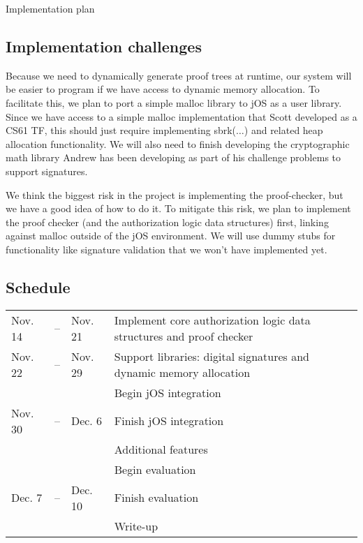 \documentclass[10pt]{article}
\begin{document}
\begin{section}{Implementation plan}
\subsection{Implementation challenges}

Because we need to dynamically generate proof trees at runtime, our system will be easier to program if we have access to dynamic memory allocation.
To facilitate this, we plan to port a simple malloc library to jOS as a user library. Since we have access to a simple malloc implementation that Scott developed as a CS61 TF, this should just require implementing \textsf{sbrk($\ldots$)} and related heap allocation functionality.
We will also need to finish developing the cryptographic math library Andrew has been developing as part of his challenge problems to support signatures.

We think the biggest risk in the project is implementing the proof-checker, but we have a good idea of how to do it.
To mitigate this risk, we plan to implement the proof checker (and the authorization logic data structures) first, linking against malloc outside of the jOS environment.
We will use dummy stubs for functionality like signature validation that we won't have implemented yet.

\subsection{Schedule}
\begin{tabular}{lcl|l}
Nov. 14 &--& Nov. 21 & Implement core authorization logic data structures and proof checker \\
Nov. 22 &--& Nov. 29 & Support libraries: digital signatures and dynamic memory allocation \\
        &  &         & Begin jOS integration \\
Nov. 30 &--& Dec. 6 & Finish jOS integration \\
        &  &        & Additional features \\
        &  &        & Begin evaluation \\
Dec. 7 &--& Dec. 10 & Finish evaluation\\
       &  &         & Write-up
\end{tabular}

\end{section}



\end{document}
